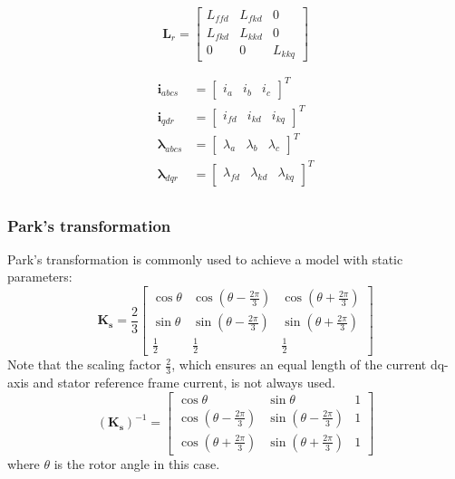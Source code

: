 \begin{equation}
	\mathbf{L}_r
	=
	\begin{bmatrix}
		L_{ffd} & L_{fkd} & 0 \\  
		L_{fkd} & L_{kkd} & 0 \\  
		0       & 0       & L_{kkq}  
	\end{bmatrix}
\end{equation}

\begin{align}
   \mathbf{i}_{abcs} &= 
  \begin{bmatrix}
    i_{a} & i_{b} & i_{c}
  \end{bmatrix}^T \\
  \mathbf{i}_{qdr} &= 
  \begin{bmatrix}
    i_{fd} & i_{kd} & i_{kq} 
  \end{bmatrix}^T \\
  \boldsymbol{\lambda}_{abcs} &= 
  \begin{bmatrix}
    \lambda_{a} & \lambda_{b} & \lambda_{c}
  \end{bmatrix}^T \\
  \boldsymbol{\lambda}_{dqr} &= 
  \begin{bmatrix}
    \lambda_{fd} & \lambda_{kd} & \lambda_{kq} 
  \end{bmatrix}^T \\
 \end{align}

\subsubsection{Park's transformation}

Park's transformation is commonly used to achieve a model with static parameters:
%
\begin{equation}
\mathbf{K_s} = \frac{2}{3}
 \begin{bmatrix} 
  \cos \theta & \cos(\theta-\frac{2\pi}{3}) & \cos(\theta+\frac{2\pi}{3}) \\
  \sin \theta & \sin(\theta-\frac{2\pi}{3}) & \sin(\theta+\frac{2\pi}{3}) \\
  \frac{1}{2} & \frac{1}{2} & \frac{1}{2}
 \end{bmatrix}
\end{equation}
%
Note that the scaling factor $\frac{2}{3}$, which ensures an equal length of the current dq-axis and stator reference frame current, is not always used. 
%
\begin{equation}
(\mathbf{K_s})^{-1} = 
 \begin{bmatrix} 
  \cos \theta & \sin \theta & 1 \\
  \cos(\theta-\frac{2\pi}{3}) & \sin(\theta-\frac{2\pi}{3}) & 1 \\
  \cos(\theta+\frac{2\pi}{3}) & \sin(\theta+\frac{2\pi}{3}) & 1
 \end{bmatrix}
\end{equation}
%
where $\theta$ is the rotor angle in this case.

